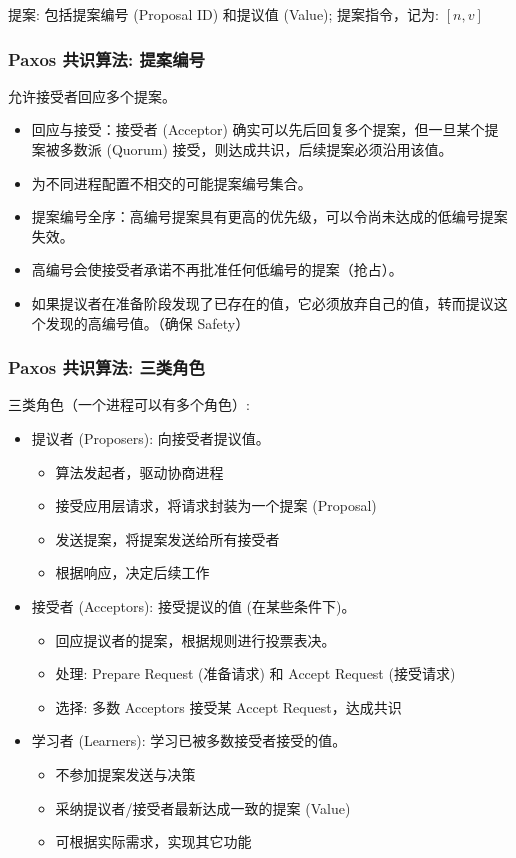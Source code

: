 提案: 包括提案编号 (Proposal ID) 和提议值 (Value); 提案指令，记为: $[n, v]$

\subsubsection{Paxos 共识算法: 提案编号}

允许接受者回应多个提案。
\begin{itemize}
\item 回应与接受：接受者 (Acceptor) 确实可以先后回复多个提案，但一旦某个提案被多数派 (Quorum) 接受，则达成共识，后续提案必须沿用该值。
\item 为不同进程配置不相交的可能提案编号集合。
\item 提案编号全序：高编号提案具有更高的优先级，可以令尚未达成的低编号提案失效。
\item 高编号会使接受者承诺不再批准任何低编号的提案（抢占）。
\item 如果提议者在准备阶段发现了已存在的值，它必须放弃自己的值，转而提议这个发现的高编号值。（确保 Safety）
\end{itemize}

\subsubsection{Paxos 共识算法: 三类角色}

三类角色（一个进程可以有多个角色）:
\begin{itemize}
\item 提议者 (Proposers): 向接受者提议值。
  \begin{itemize}
  \item 算法发起者，驱动协商进程
  \item 接受应用层请求，将请求封装为一个提案 (Proposal)
  \item 发送提案，将提案发送给所有接受者
  \item 根据响应，决定后续工作
  \end{itemize}
\item 接受者 (Acceptors): 接受提议的值 (在某些条件下)。
  \begin{itemize}
  \item 回应提议者的提案，根据规则进行投票表决。
  \item 处理: Prepare Request (准备请求) 和 Accept Request (接受请求)
  \item 选择: 多数 Acceptors 接受某 Accept Request，达成共识
  \end{itemize}
\item 学习者 (Learners): 学习已被多数接受者接受的值。
  \begin{itemize}
  \item 不参加提案发送与决策
  \item 采纳提议者/接受者最新达成一致的提案 (Value)
  \item 可根据实际需求，实现其它功能
  \end{itemize}
\end{itemize}

